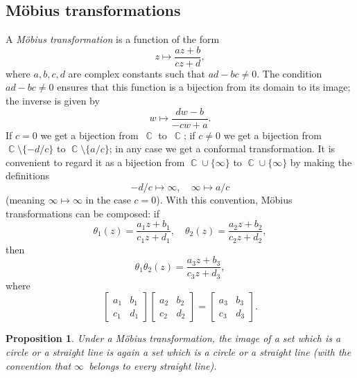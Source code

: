 \documentclass{amsproc}
\newtheorem{proposition}[theorem]{Proposition}
\theoremstyle{definition}
\theoremstyle{remark}
\DeclareMathOperator{\C}{\mathbb{C}}
\numberwithin{equation}{section}
\begin{document}

\subsection{M\"obius transformations} \label{CMS15}

A \emph{M\"obius transformation} is a function of the form
$$
z \mapsto \dfrac{az + b}{cz + d},
$$
where $ a,b,c,d $ are complex constants such that $ ad - bc \neq 0 $. The condition $ ad - bc \neq 0 $ ensures that this function is a bijection from its domain to its image; the
inverse is given by
$$
w \mapsto \dfrac{dw - b}{-cw + a}.
$$
If $ c = 0 $ we get a bijection from~$ \C $ to~$ \C $; if $ c \neq 0 $ we get a bijection from $ \C \setminus \{-d/c\} $ to $ \C \setminus \{a/c\} $; in any case we get a
conformal transformation. It is convenient to regard it as a bijection from $ \C \cup \{\infty\} $ to $ \C \cup \{\infty\} $ by making the definitions
$$
-d/c \mapsto \infty, \quad \infty \mapsto a/c
$$
(meaning $ \infty \mapsto \infty $ in the case $ c = 0 $). With this convention, M\"obius transformations can be composed: if
$$
\theta_1(z) = \dfrac{a_1z + b_1}{c_1z + d_1}, \quad \theta_2(z) = \dfrac{a_2z + b_2}{c_2z + d_2},
$$
then
$$
\theta_1 \theta_2(z) = \dfrac{a_3z + b_3}{c_3z + d_3},
$$
where
$$
\begin{bmatrix}
a_1 & b_1 \\
c_1 & d_1
\end{bmatrix}
\begin{bmatrix}
a_2 & b_2 \\
c_2 & d_2
\end{bmatrix}
=
\begin{bmatrix}
a_3 & b_3 \\
c_3 & d_3
\end{bmatrix}.
$$

\begin{proposition} \label{CMP15.1}
Under a M\"obius transformation, the image of a set which is a circle or a straight line is again a set which is a circle or a straight line (with the convention
that $ \infty $~belongs to every straight line).
\end{proposition}
\end{document}
